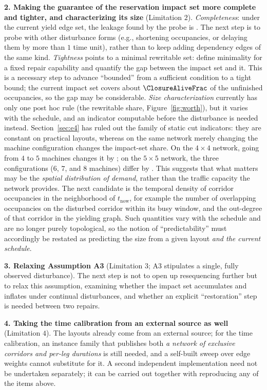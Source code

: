 \textbf{2. Making the guarantee of the reservation impact set more complete and tighter, and characterizing its size} (Limitation \(2\)).
\emph{Completeness}: under the current yield edge set, the leakage found by the probe is \ProbeLeaks.
The next step is to probe with other disturbance forms (e.g., shortening occupancies, or delaying them by more than \(1\) time unit), rather than to keep adding dependency edges of the same kind.
\emph{Tightness} points to a minimal rewritable set: define minimality for a fixed repair capability
and quantify the gap between the impact set and it. This is a necessary step to advance ``bounded'' from a sufficient condition to a tight bound; the current impact set covers about
\(\ClosureAliveFrac\) of the unfinished occupancies, so the gap may be considerable. \emph{Size characterization} currently has only one
post hoc rule (the rewritable share, Figure~\ref{fig:worth}), but it varies with the schedule, and an indicator computable before the disturbance is needed instead.
Section~\ref{sec:e4} has ruled out the family of static cut indicators: they are constant on practical layouts, whereas on the same network
merely changing the machine configuration changes the impact-set share. On the \(4\times 4\) network, going from \(4\) to \(5\) machines changes it by \PubCloSpread;
on the \(5\times 5\) network, the three configurations (\(6\), \(7\), and \(8\) machines) differ by \PubCloSpreadBig.
This suggests that what matters may be the \emph{spatial distribution of demand}, rather than the traffic capacity the network provides.
The next candidate is the temporal density of corridor occupancies in the neighborhood of \(t_{\mathrm{now}}\), for example the number of
overlapping occupancies on the disturbed corridor within its busy window, and the out-degree of that corridor in the yielding graph. Such quantities vary with the schedule and are no longer purely topological,
so the notion of ``predictability'' must accordingly be restated as predicting the size from a given layout \emph{and the current schedule}.

\textbf{3. Relaxing Assumption A3} (Limitation \(3\); A3 stipulates a single, fully observed disturbance).
The next step is not to open up resequencing further but to relax this assumption, examining whether the impact set accumulates and inflates under continual disturbances,
and whether an explicit ``restoration'' step is needed between two repairs.

\textbf{4. Taking the time calibration from an external source as well} (Limitation \(4\)). The layouts already come from an external source; for the time calibration,
an instance family that publishes both \emph{a network of exclusive corridors and per-leg durations} is still needed, and a self-built sweep over edge weights cannot substitute for it.
A second independent implementation need not be undertaken separately; it can be carried out together with reproducing any of the items above.

